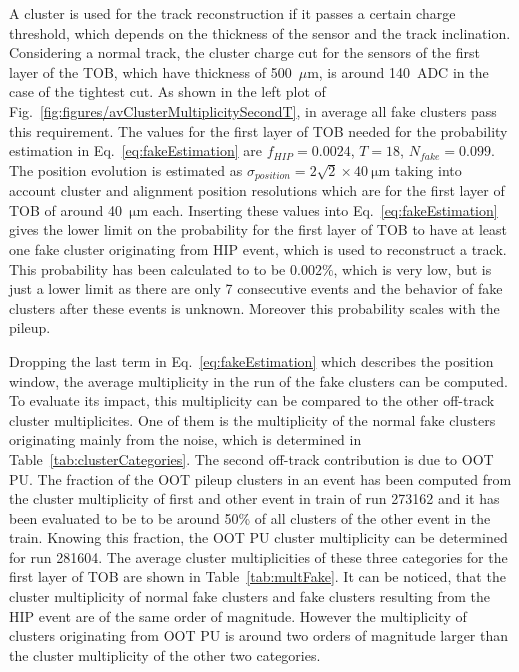 A cluster is used for the track reconstruction if it passes a certain charge threshold, which depends on the thickness of the sensor and the track inclination. Considering a normal track, the cluster charge cut for the sensors of the first layer of the TOB, which have thickness of 500~$\mu$m, is around 140~ADC in the case of the tightest cut. As shown in the left plot of Fig.~\ref{fig:figures/avClusterMultiplicitySecondT}, in average all fake clusters pass this requirement. The values for the first layer of TOB needed for the probability estimation in Eq.~\ref{eq:fakeEstimation} are $f_{HIP} = 0.0024$, $T = 18$, $N_{fake} =0.099$. The position evolution is estimated as $\sigma_{position} = 2 \sqrt{2} \times 40 ~\mathrm{\mu m}$ taking into account cluster and alignment position resolutions which are for the first layer of TOB of around 40~$\mathrm{\mu m}$ each. Inserting these values into Eq.~\ref{eq:fakeEstimation} gives the lower limit on the probability for the first layer of TOB to have at least one fake cluster originating from HIP event,  which is used to reconstruct a track. This probability has been calculated to to be $0.002\%$, which is very low, but is just a lower limit as there are only 7 consecutive events and the behavior of fake clusters after these events is unknown. Moreover this probability scales with the pileup. %

Dropping the last term  in Eq.~\ref{eq:fakeEstimation} which describes the position window, the average multiplicity in the run of the fake clusters can be computed. To evaluate its impact, this multiplicity can be compared to the other off-track cluster multiplicites. One of them is the multiplicity of the normal fake clusters originating mainly from the noise, which is determined in Table~\ref{tab:clusterCategories}. The second off-track contribution is due to OOT PU. The fraction of the OOT pileup clusters in an event has been computed from the cluster multiplicity of first and other event in train of run 273162 and it has been evaluated to be to be around 50\% of all clusters of the other event in the train. Knowing this fraction, the OOT PU cluster multiplicity can be determined for run 281604. The average cluster multiplicities of these three categories for the first layer of TOB are shown in Table~\ref{tab:multFake}. It can be noticed, that the cluster multiplicity of normal fake clusters and fake clusters resulting from the HIP event are of the same order of magnitude. However the multiplicity of clusters originating from OOT PU is around two orders of magnitude larger than the cluster multiplicity of the other two categories.  


